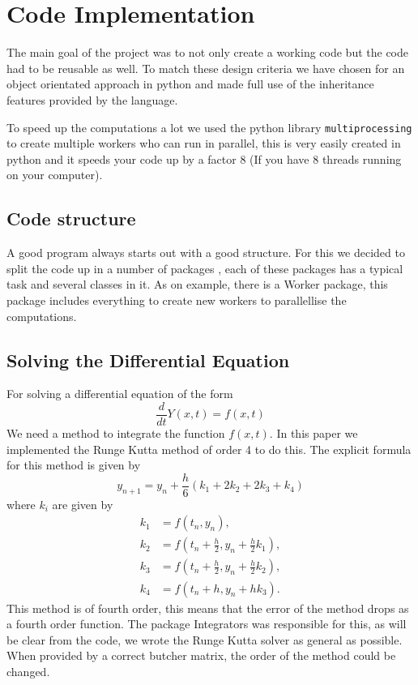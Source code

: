 \section{Code Implementation}


The main goal of the project was to not only create a working code but the code had to be reusable as well.
To match these design criteria we have chosen for an object orientated approach in python and made full use of the inheritance features provided by the language.

To speed up the computations a lot we used the python library \verb|multiprocessing| to create multiple workers who can run in parallel, this is very easily created in python and it speeds your code up by a factor 8 (If you have 8 threads running on your computer).


\subsection{Code structure}

A good program always starts out with a good structure. 
For this we decided to split the code up in a number of  packages , each of these packages has a typical task and several classes in it.
As on example, there is a Worker package, this package includes everything to create new workers to parallellise the computations.


\subsection{Solving the Differential Equation}

For solving a differential equation of the form
\begin{equation}
\dfrac{d }{dt} Y(x,t) = f(x,t)
\end{equation}
We need a method to integrate the function $ f(x,t) $.
In this paper we implemented the Runge Kutta method of order 4 to do this.
The explicit formula for this method is given by
\begin{equation}
y_{n+1} = y_n + \frac{h}{6}(k_{1} + 2k_{2} + 2k_{3} + k_{4})
\end{equation}
where $ k_i $ are given by
\begin{align*}
k_1 &= f(t_n, y_n),\\
k_2 &= f(t_n + \tfrac{h}{2}, y_n + \tfrac{h}{2} k_1),\\
k_3 &= f(t_n + \tfrac{h}{2}, y_n + \tfrac{h}{2} k_2),\\
k_4 &= f(t_n + h, y_n + hk_3).
\end{align*}
This method is of fourth order, this means that the error of the method drops as a fourth order function.
The package Integrators was responsible for this, as will be clear from the code, we wrote the Runge Kutta solver as general as possible.
When provided by a correct butcher matrix, the order of the method could be changed.


